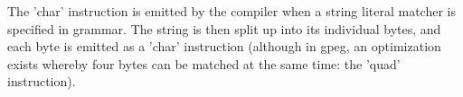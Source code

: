 The 'char' instruction is emitted by the compiler when a string literal
matcher is specified in grammar. The string is then split up into its
individual bytes, and each byte is emitted as a 'char' instruction
(although in gpeg, an optimization exists whereby four bytes can be
matched at the same time: the 'quad' instruction).
